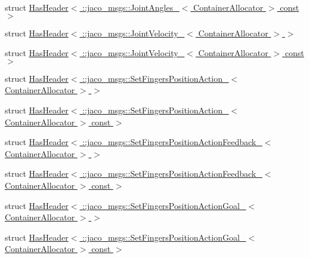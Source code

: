 \begin{DoxyCompactItemize}
struct \hyperlink{structros_1_1message__traits_1_1HasHeader_3_01_1_1jaco__msgs_1_1JointAngles___3_01ContainerAllocator_01_4_01const_01_01_4}{Has\+Header$<$ \+::jaco\+\_\+msgs\+::\+Joint\+Angles\+\_\+$<$ Container\+Allocator $>$ const  $>$}
\item 
struct \hyperlink{structros_1_1message__traits_1_1HasHeader_3_01_1_1jaco__msgs_1_1JointVelocity___3_01ContainerAllocator_01_4_01_4}{Has\+Header$<$ \+::jaco\+\_\+msgs\+::\+Joint\+Velocity\+\_\+$<$ Container\+Allocator $>$ $>$}
\item 
struct \hyperlink{structros_1_1message__traits_1_1HasHeader_3_01_1_1jaco__msgs_1_1JointVelocity___3_01ContainerAllocator_01_4_01const_01_01_4}{Has\+Header$<$ \+::jaco\+\_\+msgs\+::\+Joint\+Velocity\+\_\+$<$ Container\+Allocator $>$ const  $>$}
\item 
struct \hyperlink{structros_1_1message__traits_1_1HasHeader_3_01_1_1jaco__msgs_1_1SetFingersPositionAction___3_01ContainerAllocator_01_4_01_4}{Has\+Header$<$ \+::jaco\+\_\+msgs\+::\+Set\+Fingers\+Position\+Action\+\_\+$<$ Container\+Allocator $>$ $>$}
\item 
struct \hyperlink{structros_1_1message__traits_1_1HasHeader_3_01_1_1jaco__msgs_1_1SetFingersPositionAction___3_01C8064b31d421d852fd5578439f29449da}{Has\+Header$<$ \+::jaco\+\_\+msgs\+::\+Set\+Fingers\+Position\+Action\+\_\+$<$ Container\+Allocator $>$ const  $>$}
\item 
struct \hyperlink{structros_1_1message__traits_1_1HasHeader_3_01_1_1jaco__msgs_1_1SetFingersPositionActionFeedbackfde8f87a24c6d0cc27a7b900aabf4d64}{Has\+Header$<$ \+::jaco\+\_\+msgs\+::\+Set\+Fingers\+Position\+Action\+Feedback\+\_\+$<$ Container\+Allocator $>$ $>$}
\item 
struct \hyperlink{structros_1_1message__traits_1_1HasHeader_3_01_1_1jaco__msgs_1_1SetFingersPositionActionFeedback2b8e145454f1152b3642a71df3660d02}{Has\+Header$<$ \+::jaco\+\_\+msgs\+::\+Set\+Fingers\+Position\+Action\+Feedback\+\_\+$<$ Container\+Allocator $>$ const  $>$}
\item 
struct \hyperlink{structros_1_1message__traits_1_1HasHeader_3_01_1_1jaco__msgs_1_1SetFingersPositionActionGoal___3_01ContainerAllocator_01_4_01_4}{Has\+Header$<$ \+::jaco\+\_\+msgs\+::\+Set\+Fingers\+Position\+Action\+Goal\+\_\+$<$ Container\+Allocator $>$ $>$}
\item 
struct \hyperlink{structros_1_1message__traits_1_1HasHeader_3_01_1_1jaco__msgs_1_1SetFingersPositionActionGoal___33b10c42cbb002580720c4343da6b2b48}{Has\+Header$<$ \+::jaco\+\_\+msgs\+::\+Set\+Fingers\+Position\+Action\+Goal\+\_\+$<$ Container\+Allocator $>$ const  $>$}

\end{DoxyCompactItemize}
